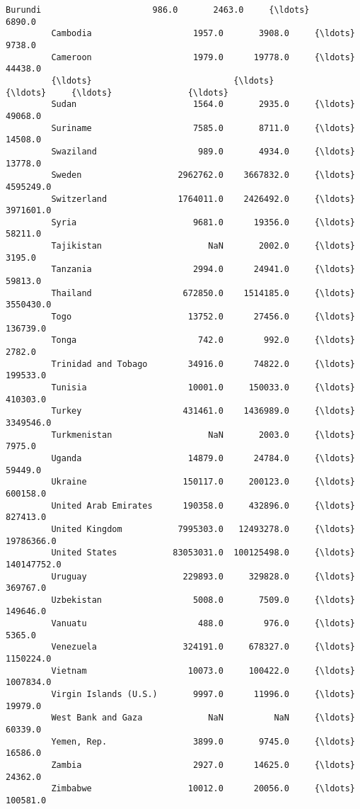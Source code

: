 \documentclass[11pt]{article}
\begin{document}
\begin{Verbatim}[commandchars=\\\{\}]
         Burundi                      986.0       2463.0     {\ldots}            6890.0   
         Cambodia                    1957.0       3908.0     {\ldots}            9738.0   
         Cameroon                    1979.0      19778.0     {\ldots}           44438.0   
         {\ldots}                            {\ldots}          {\ldots}     {\ldots}               {\ldots}   
         Sudan                       1564.0       2935.0     {\ldots}           49068.0   
         Suriname                    7585.0       8711.0     {\ldots}           14508.0   
         Swaziland                    989.0       4934.0     {\ldots}           13778.0   
         Sweden                   2962762.0    3667832.0     {\ldots}         4595249.0   
         Switzerland              1764011.0    2426492.0     {\ldots}         3971601.0   
         Syria                       9681.0      19356.0     {\ldots}           58211.0   
         Tajikistan                     NaN       2002.0     {\ldots}            3195.0   
         Tanzania                    2994.0      24941.0     {\ldots}           59813.0   
         Thailand                  672850.0    1514185.0     {\ldots}         3550430.0   
         Togo                       13752.0      27456.0     {\ldots}          136739.0   
         Tonga                        742.0        992.0     {\ldots}            2782.0   
         Trinidad and Tobago        34916.0      74822.0     {\ldots}          199533.0   
         Tunisia                    10001.0     150033.0     {\ldots}          410303.0   
         Turkey                    431461.0    1436989.0     {\ldots}         3349546.0   
         Turkmenistan                   NaN       2003.0     {\ldots}            7975.0   
         Uganda                     14879.0      24784.0     {\ldots}           59449.0   
         Ukraine                   150117.0     200123.0     {\ldots}          600158.0   
         United Arab Emirates      190358.0     432896.0     {\ldots}          827413.0   
         United Kingdom           7995303.0   12493278.0     {\ldots}        19786366.0   
         United States           83053031.0  100125498.0     {\ldots}       140147752.0   
         Uruguay                   229893.0     329828.0     {\ldots}          369767.0   
         Uzbekistan                  5008.0       7509.0     {\ldots}          149646.0   
         Vanuatu                      488.0        976.0     {\ldots}            5365.0   
         Venezuela                 324191.0     678327.0     {\ldots}         1150224.0   
         Vietnam                    10073.0     100422.0     {\ldots}         1007834.0   
         Virgin Islands (U.S.)       9997.0      11996.0     {\ldots}           19979.0   
         West Bank and Gaza             NaN          NaN     {\ldots}           60339.0   
         Yemen, Rep.                 3899.0       9745.0     {\ldots}           16586.0   
         Zambia                      2927.0      14625.0     {\ldots}           24362.0   
         Zimbabwe                   10012.0      20056.0     {\ldots}          100581.0   
         

\end{Verbatim}
\end{document}
